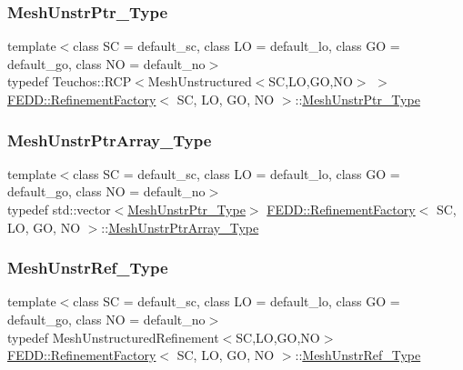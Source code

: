 \subsubsection{\texorpdfstring{Mesh\+Unstr\+Ptr\+\_\+\+Type}{MeshUnstrPtr\_Type}}
{\footnotesize\ttfamily template$<$class SC  = default\+\_\+sc, class LO  = default\+\_\+lo, class GO  = default\+\_\+go, class NO  = default\+\_\+no$>$ \\
typedef Teuchos\+::\+R\+CP$<$Mesh\+Unstructured$<$SC,LO,GO,NO$>$ $>$ \hyperlink{classFEDD_1_1RefinementFactory}{F\+E\+D\+D\+::\+Refinement\+Factory}$<$ SC, LO, GO, NO $>$\+::\hyperlink{classFEDD_1_1RefinementFactory_a1a278d01c278972af01f2996247af8ac}{Mesh\+Unstr\+Ptr\+\_\+\+Type}}

\mbox{\label{classFEDD_1_1RefinementFactory_a772a738296d703be721b9b1c877f1a9e}} 
\subsubsection{\texorpdfstring{Mesh\+Unstr\+Ptr\+Array\+\_\+\+Type}{MeshUnstrPtrArray\_Type}}
{\footnotesize\ttfamily template$<$class SC  = default\+\_\+sc, class LO  = default\+\_\+lo, class GO  = default\+\_\+go, class NO  = default\+\_\+no$>$ \\
typedef std\+::vector$<$\hyperlink{classFEDD_1_1RefinementFactory_a1a278d01c278972af01f2996247af8ac}{Mesh\+Unstr\+Ptr\+\_\+\+Type}$>$ \hyperlink{classFEDD_1_1RefinementFactory}{F\+E\+D\+D\+::\+Refinement\+Factory}$<$ SC, LO, GO, NO $>$\+::\hyperlink{classFEDD_1_1RefinementFactory_a772a738296d703be721b9b1c877f1a9e}{Mesh\+Unstr\+Ptr\+Array\+\_\+\+Type}}

\mbox{\label{classFEDD_1_1RefinementFactory_a22aea92d236fb822fef9557c22834062}} 
\subsubsection{\texorpdfstring{Mesh\+Unstr\+Ref\+\_\+\+Type}{MeshUnstrRef\_Type}}
{\footnotesize\ttfamily template$<$class SC  = default\+\_\+sc, class LO  = default\+\_\+lo, class GO  = default\+\_\+go, class NO  = default\+\_\+no$>$ \\
typedef Mesh\+Unstructured\+Refinement$<$SC,LO,GO,NO$>$ \hyperlink{classFEDD_1_1RefinementFactory}{F\+E\+D\+D\+::\+Refinement\+Factory}$<$ SC, LO, GO, NO $>$\+::\hyperlink{classFEDD_1_1RefinementFactory_a22aea92d236fb822fef9557c22834062}{Mesh\+Unstr\+Ref\+\_\+\+Type}}

